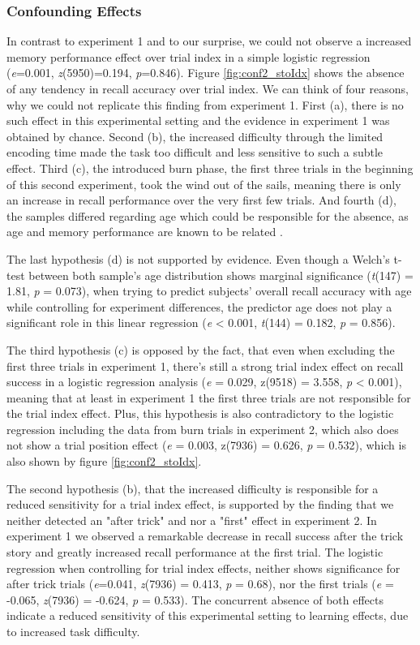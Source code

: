 \documentclass[a4paper,man,natbib,floatsintext,import]{apa6}
\begin{document}
\subsubsection{Confounding Effects}
In contrast to experiment 1 and to our surprise, we could not observe a increased memory performance effect over trial index in a simple logistic regression (\textit{e}=0.001, \textit{z}(5950)=0.194, \textit{p}=0.846). Figure \ref{fig:conf2_stoIdx} shows the absence of any tendency in recall accuracy over trial index. We can think of four reasons, why we could not replicate this finding from experiment 1.
First (a), there is no such effect in this experimental setting and the evidence in experiment 1 was obtained by chance. Second (b), the increased difficulty through the limited encoding time made the task too difficult and less sensitive to such a subtle effect. Third (c), the introduced burn phase, the first three trials in the beginning of this second experiment, took the wind out of the sails, meaning there is only an increase in recall performance over the very first few trials. And fourth (d), the samples differed regarding age which could be responsible for the absence, as age and memory performance are known to be related \citep{Hasher1988}.

The last hypothesis (d) is not supported by evidence. Even though a Welch's t-test between both sample's age distribution shows marginal significance (\textit{t}(147) = 1.81, \textit{p} = 0.073), when trying to predict subjects' overall recall accuracy with age while controlling for experiment differences, the predictor age does not play a significant role in this linear regression (\textit{e} < 0.001, \textit{t}(144) = 0.182, \textit{p} = 0.856).

The third hypothesis (c) is opposed by the fact, that even when excluding the first three trials in experiment 1, there's still a strong trial index effect on recall success in a logistic regression analysis (\textit{e} = 0.029, z(9518) = 3.558, \textit{p} < 0.001), meaning that at least in experiment 1 the first three trials are not responsible for the trial index effect. Plus, this hypothesis is also contradictory to the logistic regression including the data from burn trials in experiment 2, which also does not show a trial position effect (\textit{e} = 0.003, z(7936) = 0.626, \textit{p} = 0.532), which is also shown by figure \ref{fig:conf2_stoIdx}.

The second hypothesis (b), that the increased difficulty is responsible for a reduced sensitivity for a trial index effect, is supported by the finding that we neither detected an "after trick" and nor a "first" effect in experiment 2. In experiment 1 we observed a remarkable decrease in recall success after the trick story and greatly increased recall performance at the first trial. The logistic regression when controlling for trial index effects, neither shows significance for after trick trials (\textit{e}=0.041, \textit{z}(7936) = 0.413, \textit{p} = 0.68), nor the first trials (\textit{e} = -0.065, \textit{z}(7936) = -0.624, \textit{p} = 0.533). The concurrent absence of both effects indicate a reduced sensitivity of this experimental setting to learning effects, due to increased task difficulty.
\end{document}

